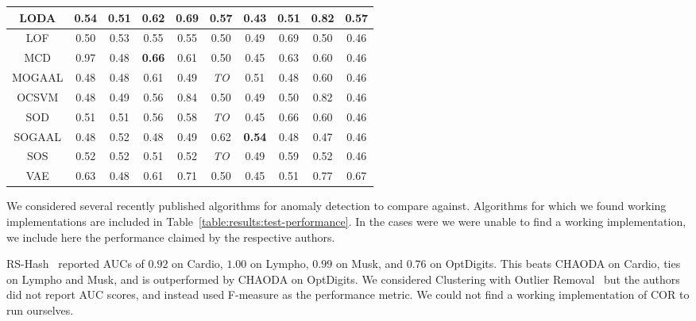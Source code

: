 \begin{table*}[!t]
\begin{center}
\begin{small}
\begin{sc}
\begin{tabular}{|c|c|c|c|c|c|c|c|c|c|}
\hline
        LODA &          0.54 &               0.51 &          0.62 &                0.69 &          0.57 &               0.43 &            0.51 &          0.82 &          0.57 \\
\hline
        LOF &          0.50 &               0.53 &          0.55 &                0.55 &          0.50 &               0.49 &            0.69 &          0.50 &          0.46 \\
\hline
        MCD &          0.97 &               0.48 & \textbf{0.66} &                0.61 &          0.50 &               0.45 &            0.63 &          0.60 &          0.46 \\
\hline
MOGAAL &          0.48 &               0.48 &          0.61 &                0.49 &   \textit{TO} &               0.51 &            0.48 &          0.60 &          0.46 \\
\hline
        OCSVM &          0.48 &               0.49 &          0.56 &                0.84 &          0.50 &               0.49 &            0.50 &          0.82 &          0.46 \\
\hline
        SOD &          0.51 &               0.51 &          0.56 &                0.58 &   \textit{TO} &               0.45 &            0.66 &          0.60 &          0.46 \\
\hline
SOGAAL &          0.48 &               0.52 &          0.48 &                0.49 &          0.62 &      \textbf{0.54} &            0.48 &          0.47 &          0.46 \\
\hline
        SOS &          0.52 &               0.52 &          0.51 &                0.52 &   \textit{TO} &               0.49 &            0.59 &          0.52 &          0.46 \\
\hline
        VAE &          0.63 &               0.48 &          0.61 &                0.71 &          0.50 &               0.45 &            0.51 &          0.77 &          0.67 \\
\hline
\end{tabular}
\end{sc}
\end{small}
\end{center}
\vskip -0.1in
\end{table*}


We considered several recently published algorithms for anomaly detection to compare against.
Algorithms for which we found working implementations are included in Table~\ref{table:results:test-performance}. %
In the cases were we were unable to find a working implementation, we include here the performance claimed by the respective authors.

RS-Hash~\cite{sathe2016subspace} reported AUCs of $0.92$ on Cardio, $1.00$ on Lympho, $0.99$ on Musk, and $0.76$ on OptDigits.
This beats CHAODA on Cardio, ties on Lympho and Musk, and is outperformed by CHAODA on OptDigits.
We considered Clustering with Outlier Removal~\cite{liu2019clustering} but the authors did not report AUC scores, and instead used F-measure as the performance metric.
We could not find a working implementation of COR to run ourselves.
